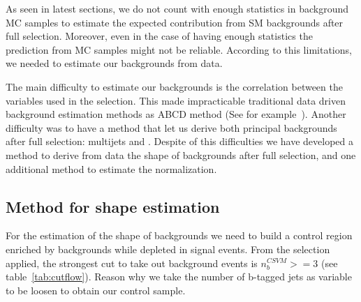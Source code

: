 As seen in latest sections, we do not count with enough statistics in background MC samples to estimate the expected contribution from SM backgrounds after full selection. Moreover, even in the case of having enough statistics the prediction from MC samples might not be reliable. According to this limitations, we needed to estimate our backgrounds from data.  

The main difficulty to estimate our backgrounds is the correlation between the variables used in the selection. This made impracticable traditional data driven background estimation methods as ABCD method (See for example~\cite{Khachatryan:2015axa}). Another difficulty was to have a method that let us derive both principal backgrounds after full selection: multijets and \ttbar. Despite of this difficulties we have developed a method to derive from data the shape of backgrounds after full selection, and one additional method to estimate the normalization.

%
%
%

\subsection{Method for shape estimation}
\label{sec:bkgmet}

For the estimation of the shape of backgrounds we need to build a control region enriched by backgrounds while depleted in signal events. From the selection applied, the strongest cut to take out background events is $n_{b}^{CSVM}>=3$ (see table~\ref{tab:cutflow}). Reason why we take the number of b-tagged jets as variable to be loosen to obtain our control sample. 

